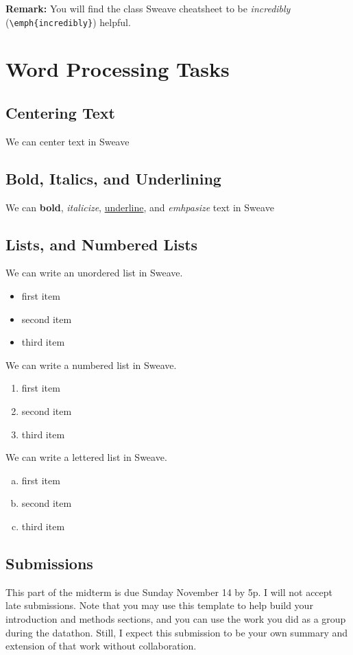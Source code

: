 \documentclass{article}\usepackage[]{graphicx}\usepackage[]{xcolor}
\begin{document}
\begin{multicols}{2}
\textbf{Remark:} You will find the class Sweave cheatsheet to be
\textit{incredibly} (\verb|\emph{incredibly}|) helpful.

\section{Word Processing Tasks}

\subsection{Centering Text}
\centerline{We can center text in Sweave}
\vspace{0.75cm}
\subsection{Bold, Italics, and Underlining }
We can \textbf{bold}, \textit{italicize}, \underline{underline}, and \emph{emhpasize} text in Sweave\\


\subsection{Lists, and Numbered Lists}
We can write an unordered list in Sweave.
\begin{itemize}\itemsep0em
\item first item
\item second item
\item third item
\end{itemize}
We can write a numbered list in Sweave.
\begin{enumerate}[1.]\itemsep0em
\item first item
\item second item
\item third item
\end{enumerate}
We can write a lettered list in Sweave.
\begin{enumerate}[a.]\itemsep0em
\item first item
\item second item
\item third item
\end{enumerate}

\subsection{Submissions}
This part of the midterm is due Sunday November 14 by 5p.
I will not accept late submissions. Note that you may use
this template to help build your introduction and methods
sections, and you can use the work you did as a group during
the datathon. Still, I expect this submission to be your own
summary and extension of that work without collaboration.


\end{multicols}
\end{document}
